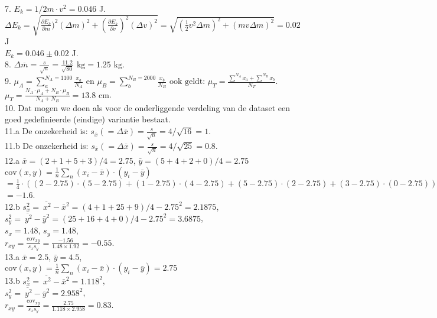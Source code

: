 7.  ${E_k = 1/2 m \cdot v^2 = 0.046}$ J.\\
$\Delta E_k = \sqrt{\frac{\partial E_k}{\partial m})^2 ( \Delta m)^2 + \left(\frac{\partial E_k}{\partial v}\right)^2 \left( \Delta v \right)^2} = \sqrt{\left( \frac{1}{2}v^2 \Delta m\right)^2 + \left( mv \Delta m \right)^2 } = 0.02$ J\\
$E_k =  0.046 \pm 0.02$ J.\\


8. ${ \Delta \overline{m} = \frac{s}{\sqrt{n}} = \frac{11.2}{\sqrt{80}}} \text{ kg} = 1.25\text{ kg}$.\\


9. ${ \mu_A = \sum_a^{N_A=1100} \frac{x_a}{N_A} \text{ en } \mu_B = \sum_b^{N_B=2000} \frac{x_b}{N_B} \text{ ook geldt: }  \mu_T = \frac{\sum^{N_A} x_a + \sum^{N_B} x_b}{N_T}}$.\\
${ \mu_T =  \frac{N_A \cdot \mu_A + N_B \cdot \mu_B}{N_A + N_B}} = 13.8 \text{ cm}$.\\


10. Dat mogen we doen als voor de onderliggende verdeling van de dataset een goed gedefinieerde (eindige) variantie bestaat.\\


11.a De onzekerheid is: $s_{\overline{x}} (=\Delta \overline{x})= \frac{s}{\sqrt{n}} = 4/\sqrt{16} = 1 $.\\
11.b De onzekerheid is: $s_{\overline{x}} (=\Delta \overline{x})= \frac{s}{\sqrt{n}} = 4/\sqrt{25} = 0.8 $.\\


12.a $\bar{x} = (2+1+5+3)/4 = 2.75$, $\bar{y} = (5+4+2+0)/4 = 2.75$\\
$\text{cov}(x,y) = \frac{1}{n} \sum_n (x_i- \bar{x})\cdot (y_i - \bar{y})$\\
$ = \frac{1}{4}\cdot ((2-2.75)\cdot(5-2.75) +(1-2.75)\cdot(4-2.75)+(5-2.75)\cdot(2-2.75) +(3-2.75)\cdot(0-2.75))$\\
$ = -1.6$.\\
12.b $s_x^2 = \overline{~x^2}-\bar{x}^2 = (4+1+25+9)/4 - 2.75^2 = 2.1875$,\\
$s_y^2 = \overline{~y^2}- \bar{y}^2 = (25+16+4+0)/4 - 2.75^2 = 3.6875$,\\
$s_x = 1.48$, $s_y = 1.48$,\\
$r_{xy} = \frac{\text{cov}_{xy}}{s_x s_y} = \frac{-1.56}{1.48\times 1.92} = -0.55$.\\



13.a $\bar{x} = 2.5$, $\bar{y} = 4.5$,\\
$\text{cov}(x,y) = \frac{1}{n} \sum_n (x_i-\bar{x})\cdot (y_i - \bar{y}) = 2.75$\\
13.b $s_x^2 = \overline{~x^2}-\bar{x}^2 = 1.118^2$,\\
$s_y^2 = \overline{~y^2}-\overline{y}^2 = 2.958^2$,\\
$r_{xy} = \frac{\text{cov}_{xy}}{s_x s_y} = \frac{2.75}{1.118\times 2.958} = 0.83$.\\



